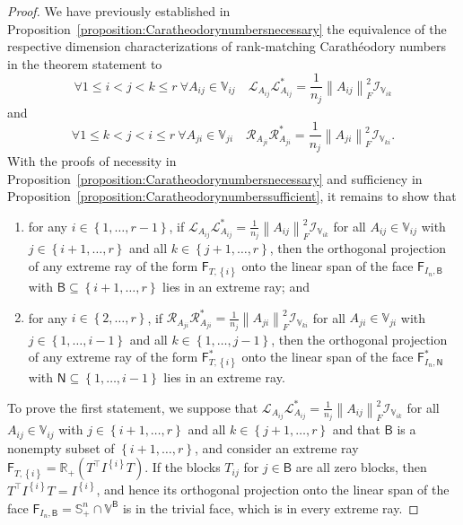 \documentclass[10pt,a4paper]{amsart}
\begin{document}
\begin{proof}
We have previously established in
Proposition~\ref{proposition:Caratheodorynumbersnecessary} the equivalence
of the respective dimension characterizations of rank-matching
Carath\'eodory numbers in the theorem statement to
\[
\forall 1 \leq i < j < k \leq r \ \forall A_{ij} \in \mathbb{V}_{ij} \quad
\mathcal{L}_{A_{ij}} \mathcal{L}^{*}_{A_{ij}} = \frac{1}{n_{j}} \left\lVert
A_{ij}\right\rVert_{F}^{2} \mathcal{I}_{\mathbb{V}_{ik}}
\]
and
\[
\forall 1 \leq k < j < i \leq r \ \forall A_{ji} \in \mathbb{V}_{ji} \quad
\mathcal{R}_{A_{ji}} \mathcal{R}^{*}_{A_{ji}} = \frac{1}{n_{j}} \left\lVert
A_{ji}\right\rVert_{F}^{2} \mathcal{I}_{\mathbb{V}_{ki}}.
\]
With the proofs of necessity in
Proposition~\ref{proposition:Caratheodorynumbersnecessary} and sufficiency
in Proposition~\ref{proposition:Caratheodorynumberssufficient}, it remains
to show that
\begin{enumerate}[label=(\roman*)]
\item for any $i \in \left\{1, \dotsc, r-1\right\}$, if
$\mathcal{L}_{A_{ij}} \mathcal{L}^{*}_{A_{ij}} = \frac{1}{n_{j}}
\left\lVert A_{ij}\right\rVert_{F}^{2} \mathcal{I}_{\mathbb{V}_{ik}}$ for
all $A_{ij} \in \mathbb{V}_{ij}$ with $j \in \left\{i+1, \dotsc, r\right\}$
and all $k \in \left\{j+1, \dotsc, r\right\}$, then the orthogonal
projection of any extreme ray of the form $\mathsf{F}_{T,\left\{i\right\}}$
onto the linear span of the face $\mathsf{F}_{I_{n},\mathsf{B}}$ with
$\mathsf{B} \subseteq \left\{i+1, \dotsc, r\right\}$ lies in an extreme
ray; and

\item for any $i \in \left\{2, \dotsc, r\right\}$, if $\mathcal{R}_{A_{ji}}
\mathcal{R}^{*}_{A_{ji}} = \frac{1}{n_{j}} \left\lVert
A_{ji}\right\rVert_{F}^{2} \mathcal{I}_{\mathbb{V}_{ki}}$ for all $A_{ji}
\in \mathbb{V}_{ji}$ with $j \in \left\{1, \dotsc, i-1\right\}$ and all $k
\in \left\{1, \dotsc, j-1\right\}$, then the orthogonal projection of any
extreme ray of the form $\mathsf{F}^{*}_{T,\left\{i\right\}}$ onto the
linear span of the face $\mathsf{F}^{*}_{I_{n},\mathsf{N}}$ with
$\mathsf{N} \subseteq \left\{1, \dotsc, i-1\right\}$ lies in an extreme
ray.

\end{enumerate}

To prove the first statement, we suppose that $\mathcal{L}_{A_{ij}}
\mathcal{L}^{*}_{A_{ij}} = \frac{1}{n_{j}} \left\lVert
A_{ij}\right\rVert_{F}^{2} \mathcal{I}_{\mathbb{V}_{ik}}$ for all $A_{ij}
\in \mathbb{V}_{ij}$ with $j \in \left\{i+1, \dotsc, r\right\}$ and all $k
\in \left\{j+1, \dotsc, r\right\}$ and that $\mathsf{B}$ is a nonempty
subset of $\left\{i+1, \dotsc, r\right\}$, and consider an extreme ray
$\mathsf{F}_{T,\left\{i\right\}} = \mathbb{R}_+(T^{\top}
I^{\left\{i\right\}} T)$. If the blocks $T_{ij}$ for $j \in \mathsf{B}$ are
all zero blocks, then $T^{\top} I^{\left\{i\right\}} T =
I^{\left\{i\right\}}$, and hence its orthogonal projection onto the linear
span of the face $\mathsf{F}_{I_{n},\mathsf{B}} = \mathbb{S}^{n}_{+} \cap
\mathbb{V}^{\mathsf{B}}$ is in the trivial face, which is in every extreme
ray.


\end{proof}
\end{document}
